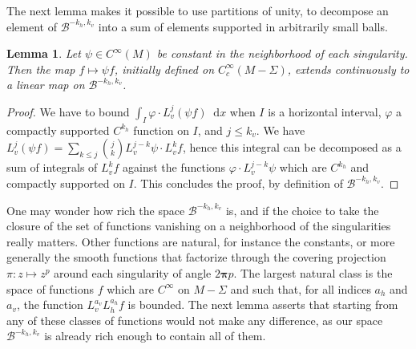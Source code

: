 \documentclass[11pt, a4paper, oneside, final, pagebackref]{amsart}
\newcommand{\boB}{\mathcal{B}}
\newcommand{\dd}{\mathop{}\!\mathrm{d}}
\newcommand{\bpi}{\boldsymbol{\pi}}
\renewcommand{\phi}{\varphi}
\renewcommand{\leq}{\leqslant}
\newtheorem{lem}[thm]{Lemma}
\theoremstyle{definition}
\numberwithin{equation}{section}
\begin{document}
The next lemma makes it possible to use partitions of unity, to decompose an
element of $\boB^{-k_h, k_v}$ into a sum of elements supported in arbitrarily
small balls.
\begin{lem}
\label{lem:partition_unite} Let $\psi \in C^\infty(M)$ be constant in the
neighborhood of each singularity. Then the map $f \mapsto \psi f$, initially
defined on $C^\infty_c(M-\Sigma)$, extends continuously to a linear map on
$\boB^{-k_h, k_v}$.
\end{lem}
\begin{proof}
We have to bound $\int_I \phi \cdot L_v^j(\psi f) \dd x$ when $I$ is a
horizontal interval, $\phi$ a compactly supported $C^{k_h}$ function on $I$,
and $j\leq k_v$. We have $L_v^j(\psi f) = \sum_{k\leq j}\binom{j}{k}
L_v^{j-k}\psi \cdot L_v^k f$, hence this integral can be decomposed as a sum
of integrals of $L_v^k f$ against the functions $\phi \cdot L_v^{j-k}\psi$
which are $C^{k_h}$ and compactly supported on $I$. This concludes the proof,
by definition of $\boB^{-k_h, k_v}$.
\end{proof}

One may wonder how rich the space $\boB^{-k_h, k_v}$ is, and if the choice to
take the closure of the set of functions vanishing on a neighborhood of the
singularities really matters. Other functions are natural, for instance the
constants, or more generally the smooth functions that factorize through the
covering projection $\pi: z \mapsto z^p$ around each singularity of angle
$2\bpi p$. The largest natural class is the space of functions $f$ which are
$C^\infty$ on $M-\Sigma$ and such that, for all indices $a_h$ and $a_v$, the
function $L_v^{a_v} L_h^{a_h} f$ is bounded. The next lemma asserts that
starting from any of these classes of functions would not make any
difference, as our space $\boB^{-k_h, k_v}$ is already rich enough to contain
all of them.
\end{document}
